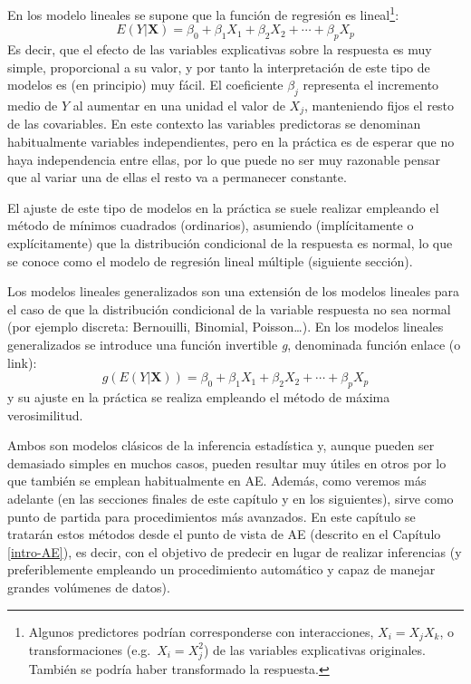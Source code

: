 \documentclass[
]{book}
\theoremstyle{break}
\theoremstyle{definition}
\theoremstyle{definition}
\theoremstyle{definition}
\theoremstyle{remark}
\begin{document}
En los modelo lineales se supone que la función de regresión es lineal\footnote{Algunos predictores podrían corresponderse con interacciones, \(X_i = X_j X_k\), o transformaciones (e.g.~\(X_i = X_j^2\)) de las variables explicativas originales. También se podría haber transformado la respuesta.}:
\[E( Y | \mathbf{X} ) = \beta_{0}+\beta_{1}X_{1}+\beta_{2}X_{2}+\cdots+\beta_{p}X_{p}\]
Es decir, que el efecto de las variables explicativas sobre la respuesta es muy simple, proporcional a su valor, y por tanto la interpretación de este tipo de modelos es (en principio) muy fácil.
El coeficiente \(\beta_j\) representa el incremento medio de \(Y\) al aumentar en una unidad el valor de \(X_j\), manteniendo fijos el resto de las covariables.
En este contexto las variables predictoras se denominan habitualmente variables independientes, pero en la práctica es de esperar que no haya independencia entre ellas, por lo que puede no ser muy razonable pensar que al variar una de ellas el resto va a permanecer constante.

El ajuste de este tipo de modelos en la práctica se suele realizar empleando el método de mínimos cuadrados (ordinarios), asumiendo (implícitamente o explícitamente) que la distribución condicional de la respuesta es normal, lo que se conoce como el modelo de regresión lineal múltiple (siguiente sección).

Los modelos lineales generalizados son una extensión de los modelos lineales para el caso de que la distribución condicional de la variable respuesta no sea normal (por ejemplo discreta: Bernouilli, Binomial, Poisson\ldots).
En los modelos lineales generalizados se introduce una función invertible \emph{g}, denominada función enlace (o link):
\[g\left(E(Y | \mathbf{X} )\right) = \beta_{0}+\beta_{1}X_{1}+\beta_{2}X_{2}+\cdots+\beta_{p}X_{p}\]
y su ajuste en la práctica se realiza empleando el método de máxima verosimilitud.

Ambos son modelos clásicos de la inferencia estadística y, aunque pueden ser demasiado simples en muchos casos, pueden resultar muy útiles en otros por lo que también se emplean habitualmente en AE.
Además, como veremos más adelante (en las secciones finales de este capítulo y en los siguientes), sirve como punto de partida para procedimientos más avanzados.
En este capítulo se tratarán estos métodos desde el punto de vista de AE (descrito en el Capítulo \ref{intro-AE}), es decir, con el objetivo de predecir en lugar de realizar inferencias (y preferiblemente empleando un procedimiento automático y capaz de manejar grandes volúmenes de datos).
\end{document}

